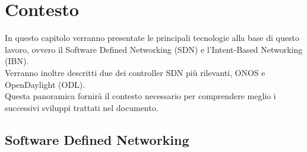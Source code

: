\chapter{Contesto}
\label{cap:contesto}
In questo capitolo verranno presentate le principali tecnologie alla base di questo lavoro, ovvero il Software Defined Networking (SDN) e l'Intent-Based Networking (IBN). 
\\Verranno inoltre descritti due dei controller SDN più rilevanti, ONOS e OpenDaylight (ODL). 
\\Questa panoramica fornirà il contesto necessario per comprendere meglio i successivi sviluppi trattati nel documento.
\section{Software Defined Networking}
\label{ch:SDN}

